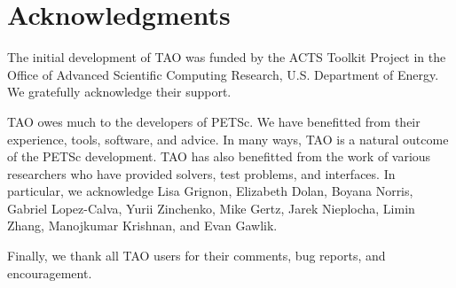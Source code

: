 %
%

\section*{Acknowledgments}

The initial development of TAO was funded by the ACTS Toolkit Project in
the Office of Advanced Scientific Computing Research, U.S. Department
of Energy. We gratefully acknowledge their support.

TAO owes much to the developers of PETSc. We have benefitted
from their experience, tools, software, and advice. In many ways, TAO is a 
natural outcome of the PETSc development.
%
TAO has also benefitted from the work of various researchers
who have provided solvers, test problems, and interfaces.
In particular, we acknowledge Lisa Grignon, Elizabeth Dolan, 
Boyana Norris, Gabriel Lopez-Calva, Yurii Zinchenko, Mike Gertz,
Jarek Nieplocha, Limin Zhang, Manojkumar Krishnan, and Evan Gawlik.

Finally, we thank all TAO users for their comments, bug reports, and
encouragement.

